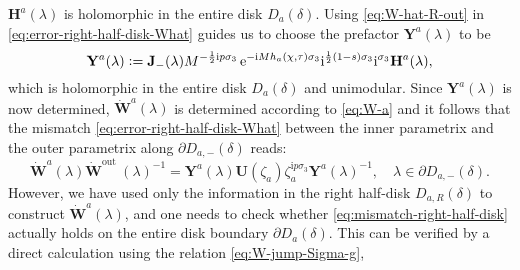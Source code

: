 $\mathbf{H}^{a}(\lambda)$ is holomorphic in the entire disk $D_{a}(\delta)$.
Using \eqref{eq:W-hat-R-out} in \eqref{eq:error-right-half-disk-What} guides us to choose the prefactor $\mathbf{Y}^a(\lambda)$ to be
\begin{equation}
\mathbf{Y}^a(\lambda)\vcentcolon= \mathbf{J}_{-}(\lambda)  M^{-\frac{1}{2}\mathrm{i} p \sigma_3} \,\mathrm{e}^{- \mathrm{i} M {h}_a(\chi,\tau)\sigma_3} \mathrm{i}^{\frac{1}{2}(1-s)\sigma_3} \mathrm{i}^{\sigma_3}  
\mathbf{H}^a(\lambda),
\label{eq:A-a}
\end{equation}
which is holomorphic in the entire disk $D_a(\delta)$ and unimodular.
Since $\mathbf{Y}^a(\lambda)$ is now determined, $\dot{\mathbf{W}}^a(\lambda)$ is determined according to \eqref{eq:W-a} and it follows that the mismatch \eqref{eq:error-right-half-disk-What} 
between the inner parametrix and the outer parametrix along $\partial D_{a,-}(\delta)$ reads:
\begin{equation}
\dot{\mathbf{W}}^{a}(\lambda) \dot{\mathbf{W}}^{\text {out }}(\lambda)^{-1}=\mathbf{Y}^{a}(\lambda)\mathbf{U}\left(\zeta_{a}\right) \zeta_{a}^{\mathrm{i} p \sigma_{3}} \mathbf{Y}^{a}(\lambda )^{-1},\quad \lambda \in \partial D_{a,-}(\delta).
\label{eq:mismatch-right-half-disk}
\end{equation}
However, we have used only the information in the right half-disk $D_{a,R}(\delta)$ to construct $\dot{\mathbf{W}}^a(\lambda)$, and one needs to check whether \eqref{eq:mismatch-right-half-disk} actually holds on the entire disk boundary $\partial D_{a}(\delta)$. This can be verified by a direct calculation using the relation \eqref{eq:W-jump-Sigma-g},

